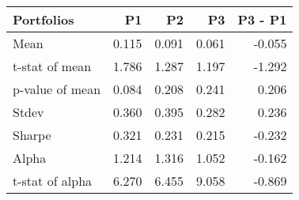 \begin{tabular}{lrrrr}
\toprule
Portfolios & P1 & P2 & P3 & P3 - P1 \\
\midrule
Mean & 0.115 & 0.091 & 0.061 & -0.055 \\
t-stat of mean & 1.786 & 1.287 & 1.197 & -1.292 \\
p-value of mean & 0.084 & 0.208 & 0.241 & 0.206 \\
Stdev & 0.360 & 0.395 & 0.282 & 0.236 \\
Sharpe & 0.321 & 0.231 & 0.215 & -0.232 \\
Alpha & 1.214 & 1.316 & 1.052 & -0.162 \\
t-stat of alpha & 6.270 & 6.455 & 9.058 & -0.869 \\
\bottomrule
\end{tabular}
